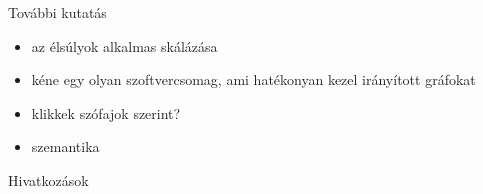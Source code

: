 \documentclass{beamer}
\newlength{\onecolwid}
\begin{document}
\begin{frame}[t]
\begin{columns}[t]
\begin{column}{\onecolwid}
      \begin{block}{További kutatás}
        \begin{itemize}
          \item az élsúlyok alkalmas skálázása
          \item kéne egy olyan szoftvercsomag, ami hatékonyan kezel
            irányított gráfokat
          \item klikkek szófajok szerint?
          \item szemantika
        \end{itemize}
      \end{block}

      \begin{block}{Hivatkozások}
        \small
        
          
      \end{block}

    \end{column}
  \end{columns}
\end{frame}
\end{document}
